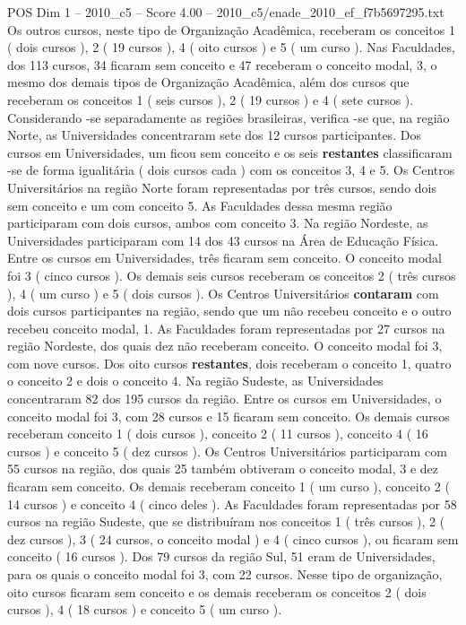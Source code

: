\begin{textsample}{POS Dim 1 – 2010\_c5 – Score 4.00 – 2010\_c5/enade\_2010\_ef\_f7b5697295.txt}
Os outros cursos, neste tipo de Organização Acadêmica, receberam os conceitos 1 ( dois cursos ), 2 ( 19 cursos ), 4 ( oito cursos ) e 5 ( um curso ).
Nas Faculdades, dos 113 cursos, 34 ficaram sem conceito e 47 receberam o conceito modal, 3, o mesmo dos demais tipos de Organização Acadêmica, além dos cursos que receberam os conceitos 1 ( seis cursos ), 2 ( 19 cursos ) e 4 ( sete cursos ).
Considerando -se separadamente as regiões brasileiras, verifica -se que, na região Norte, as Universidades concentraram sete dos 12 cursos participantes.
Dos cursos em Universidades, um ficou sem conceito e os seis \textbf{restantes} classificaram -se de forma igualitária ( dois cursos cada ) com os conceitos 3, 4 e 5.
Os Centros Universitários na região Norte foram representadas por três cursos, sendo dois sem conceito e um com conceito 5.
As Faculdades dessa mesma região participaram com dois cursos, ambos com conceito 3.
Na região Nordeste, as Universidades participaram com 14 dos 43 cursos na Área de Educação Física.
Entre os cursos em Universidades, três ficaram sem conceito.
O conceito modal foi 3 ( cinco cursos ).
Os demais seis cursos receberam os conceitos 2 ( três cursos ), 4 ( um curso ) e 5 ( dois cursos ).
Os Centros Universitários \textbf{contaram} com dois cursos participantes na região, sendo que um não recebeu conceito e o outro recebeu conceito modal, 1.
As Faculdades foram representadas por 27 cursos na região Nordeste, dos quais dez não receberam conceito.
O conceito modal foi 3, com nove cursos.
Dos oito cursos \textbf{restantes}, dois receberam o conceito 1, quatro o conceito 2 e dois o conceito 4.
Na região Sudeste, as Universidades concentraram 82 dos 195 cursos da região.
Entre os cursos em Universidades, o conceito modal foi 3, com 28 cursos e 15 ficaram sem conceito.
Os demais cursos receberam conceito 1 ( dois cursos ), conceito 2 ( 11 cursos ), conceito 4 ( 16 cursos ) e conceito 5 ( dez cursos ).
Os Centros Universitários participaram com 55 cursos na região, dos quais 25 também obtiveram o conceito modal, 3 e dez ficaram sem conceito.
Os demais receberam conceito 1 ( um curso ), conceito 2 ( 14 cursos ) e conceito 4 ( cinco deles ).
As Faculdades foram representadas por 58 cursos na região Sudeste, que se distribuíram nos conceitos 1 ( três cursos ), 2 ( dez cursos ), 3 ( 24 cursos, o conceito modal ) e 4 ( cinco cursos ), ou ficaram sem conceito ( 16 cursos ).
Dos 79 cursos da região Sul, 51 eram de Universidades, para os quais o conceito modal foi 3, com 22 cursos.
Nesse tipo de organização, oito cursos ficaram sem conceito e os demais receberam os conceitos 2 ( dois cursos ), 4 ( 18 cursos ) e conceito 5 ( um curso ).

\end{textsample}
